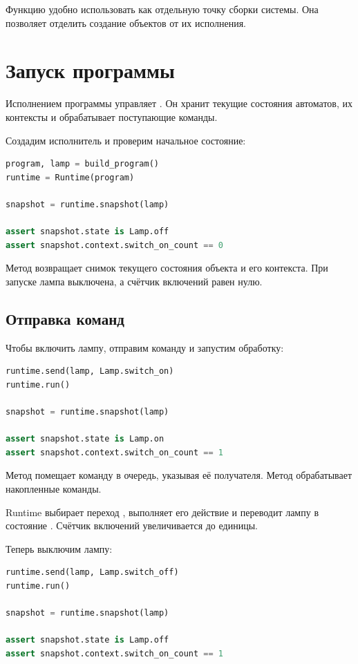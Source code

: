 Функцию  удобно использовать
как отдельную точку сборки системы. Она позволяет
отделить создание объектов от их исполнения.

\section{Запуск программы}

Исполнением программы управляет .
Он хранит текущие состояния автоматов, их контексты
и обрабатывает поступающие команды.

Создадим исполнитель и проверим начальное состояние:

\begin{lstlisting}[language=Python,numbers=none]
program, lamp = build_program()
runtime = Runtime(program)

snapshot = runtime.snapshot(lamp)

assert snapshot.state is Lamp.off
assert snapshot.context.switch_on_count == 0
\end{lstlisting}

Метод  возвращает снимок текущего
состояния объекта и его контекста. При запуске
лампа выключена, а счётчик включений равен нулю.

\subsection{Отправка команд}

Чтобы включить лампу, отправим команду
 и запустим обработку:

\begin{lstlisting}[language=Python,numbers=none]
runtime.send(lamp, Lamp.switch_on)
runtime.run()

snapshot = runtime.snapshot(lamp)

assert snapshot.state is Lamp.on
assert snapshot.context.switch_on_count == 1
\end{lstlisting}

Метод  помещает команду в очередь,
указывая её получателя. Метод 
обрабатывает накопленные команды.

Runtime выбирает переход ,
выполняет его действие и переводит лампу
в состояние . Счётчик включений
увеличивается до единицы.

Теперь выключим лампу:

\begin{lstlisting}[language=Python,numbers=none]
runtime.send(lamp, Lamp.switch_off)
runtime.run()

snapshot = runtime.snapshot(lamp)

assert snapshot.state is Lamp.off
assert snapshot.context.switch_on_count == 1
\end{lstlisting}

